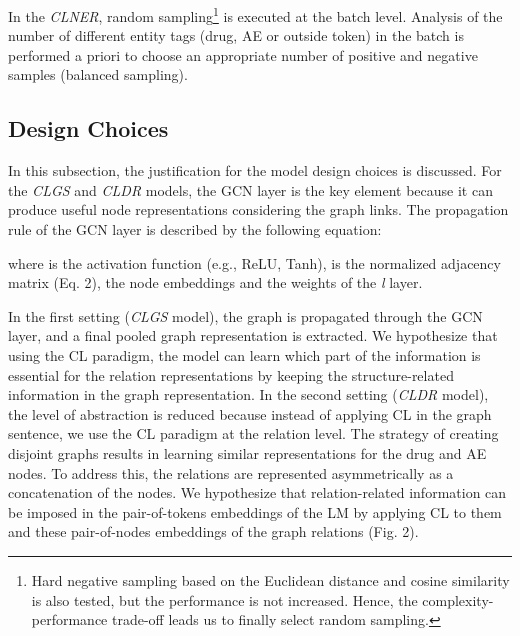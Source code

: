 \documentclass[11pt]{article}
\begin{document}
In the \textit{CLNER}, random sampling\footnote{Hard negative sampling based on the Euclidean distance and cosine similarity is also tested, but the performance is not increased. Hence, the complexity-performance trade-off leads us to finally select random sampling.} is executed at the batch level. Analysis of the number of different entity tags (drug, AE or outside token) in the batch is performed a priori to choose an appropriate number of positive and negative samples (balanced sampling).

\vspace{-1mm}

\subsection{Design Choices}

In this subsection, the justification for the model design choices is discussed. For the \textit{CLGS} and \textit{CLDR} models, the GCN layer is the key element because it can produce useful node representations considering the graph links. The propagation rule of the GCN layer is described by the following equation:

\vspace{-5.5mm} 

where  is the activation function (e.g., ReLU, Tanh),  is the normalized adjacency matrix (Eq. 2),  the node embeddings and  the weights of the \textit{l} layer.

In the first setting (\textit{CLGS} model), the graph is propagated through the GCN layer, and a final pooled graph representation is extracted. We hypothesize that using the CL paradigm, the model can learn which part of the information is essential for the relation representations by keeping the structure-related information in the graph representation. In the second setting (\textit{CLDR} model), the level of abstraction is reduced because instead of applying CL in the graph sentence, we use the CL paradigm at the relation level. The strategy of creating disjoint graphs results in learning similar representations for the drug and AE nodes. To address this, the relations are represented asymmetrically as a concatenation of the nodes. We hypothesize that relation-related information can be imposed in the pair-of-tokens embeddings of the LM by applying CL to them and these pair-of-nodes embeddings of the graph relations (Fig. 2).

\vspace{-1mm}
\end{document}

